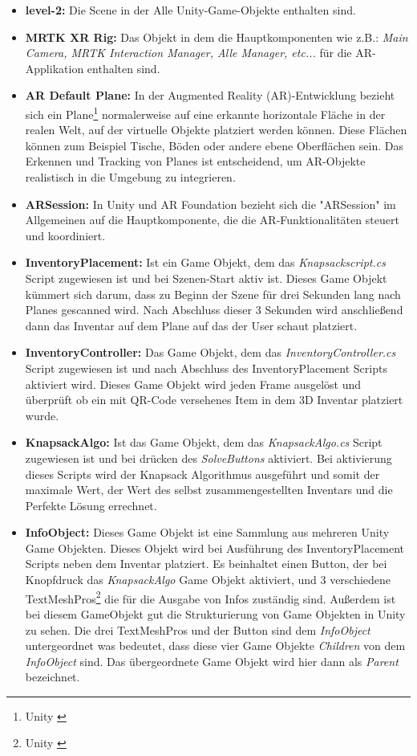 \begin{itemize}
    \item \textbf{level-2:} Die Scene in der Alle Unity-Game-Objekte enthalten sind.
    \item \textbf{MRTK XR Rig:} Das Objekt in dem die Hauptkomponenten wie z.B.: \textit{Main Camera, MRTK Interaction
    Manager, Alle Manager, etc... } für die AR-Applikation enthalten sind.
    \item \textbf{AR Default Plane:} In der Augmented Reality (AR)-Entwicklung bezieht sich ein Plane\footnote{Unity \cite{Plane}} normalerweise
    auf eine erkannte horizontale Fläche in der realen Welt, auf der virtuelle Objekte platziert werden können. Diese
    Flächen können zum Beispiel Tische, Böden oder andere ebene Oberflächen sein. Das Erkennen und Tracking von Planes
    ist entscheidend, um AR-Objekte realistisch in die Umgebung zu integrieren.
    \item \textbf{ARSession:} In Unity und AR Foundation bezieht sich die "ARSession" im Allgemeinen auf die
    Hauptkomponente, die die AR-Funktionalitäten steuert und koordiniert.
    \item \textbf{InventoryPlacement:} Ist ein Game Objekt, dem das \textit{Knapsackscript.cs} Script zugewiesen ist und
    bei Szenen-Start aktiv ist. Dieses Game Objekt kümmert sich darum, dass zu Beginn der Szene für drei Sekunden lang
    nach Planes gescanned wird. Nach Abschluss dieser 3 Sekunden wird anschließend dann das Inventar auf dem Plane auf
    das der User schaut platziert.
    \item \textbf{InventoryController:} Das Game Objekt, dem das \textit{InventoryController.cs} Script zugewiesen ist
    und nach Abschluss des InventoryPlacement Scripts aktiviert wird. Dieses Game Objekt wird jeden Frame ausgelöst
    und überprüft ob ein mit QR-Code versehenes Item in dem 3D Inventar platziert wurde.
    \item \textbf{KnapsackAlgo:} Ist das Game Objekt, dem das \textit{KnapsackAlgo.cs} Script zugewiesen ist und bei
    drücken des \textit{SolveButtons} aktiviert. Bei aktivierung dieses Scripts wird der Knapsack Algorithmus
    ausgeführt und somit der maximale Wert, der Wert des selbst zusammengestellten Inventars und die Perfekte Lösung
    errechnet.
    \item \textbf{InfoObject:} Dieses Game Objekt ist eine Sammlung aus mehreren Unity Game Objekten. Dieses Objekt wird
    bei Ausführung des InventoryPlacement Scripts neben dem Inventar platziert. Es beinhaltet einen Button, der bei Knopfdruck
    das \textit{KnapsackAlgo} Game Objekt aktiviert, und 3 verschiedene TextMeshPros\footnote{Unity \cite{TextMesh}} die
    für die Ausgabe von Infos zuständig sind.
    Außerdem ist bei diesem GameObjekt gut die Strukturierung von Game Objekten in Unity zu sehen. Die drei TextMeshPros
    und der Button sind dem \textit{InfoObject} untergeordnet was bedeutet, dass diese vier Game Objekte \textit{Children}
    von dem \textit{InfoObject} sind. Das übergeordnete Game Objekt wird hier dann als \textit{Parent} bezeichnet.
\end{itemize}

